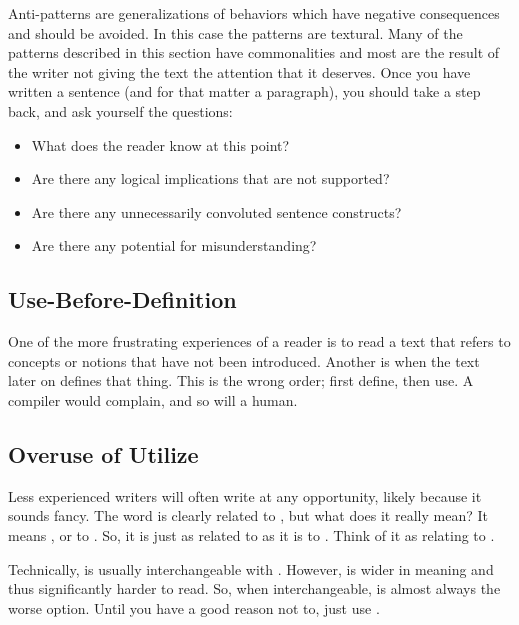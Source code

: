 \documentclass[a4paper, oneside]{memoir}
\newcommand{\idx}[1]{\index{#1}\marginpar{\raggedright \tiny #1}}
\begin{document}
Anti-patterns are generalizations of behaviors which have negative consequences and should be avoided. In this case the patterns are textural. Many of the patterns described in this section have commonalities and most are the result of the writer not giving the text the attention that it deserves. Once you have written a sentence (and for that matter a paragraph), you should take a step back, and ask yourself the questions:
\begin{itemize}
  \item What does the reader know at this point?
  \item Are there any logical implications that are not supported?
  \item Are there any unnecessarily convoluted sentence constructs?
  \item Are there any potential for misunderstanding?
\end{itemize}

\subsection{Use-Before-Definition}

One of the more frustrating experiences of a reader is to read a text that refers to concepts or notions that have not been introduced. Another is when the text later on defines that thing. This is the wrong order; first define, then use. A compiler would complain, and so will a human.

\subsection{Overuse of Utilize}

Less experienced writers will often write \idx{Utilize} at any opportunity, likely because it sounds fancy. The word is clearly related to , but what does it really mean? It means , or to . So, it is just as related to  as it is to . Think of it as relating to .

Technically,  is usually interchangeable with . However,  is wider in meaning and thus significantly harder to read. So, when interchangeable,  is almost always the worse option. Until you have a good reason not to, just use .

\end{document}
